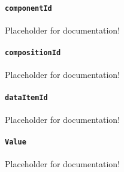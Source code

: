 \paragraph{\texttt{componentId}}\mbox{}
\newline\tab Placeholder for documentation!

\paragraph{\texttt{compositionId}}\mbox{}
\newline\tab Placeholder for documentation!

\paragraph{\texttt{dataItemId}}\mbox{}
\newline\tab Placeholder for documentation!

\paragraph{\texttt{Value}}\mbox{}
\newline\tab Placeholder for documentation!
\FloatBarrier
